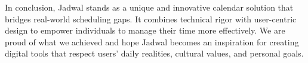 \documentclass[12pt,a4paper,twoside]{report}
\begin{document}
In conclusion, Jadwal stands as a unique and innovative calendar solution that bridges real-world scheduling gaps. It combines technical rigor with user-centric design to empower individuals to manage their time more effectively. We are proud of what we achieved and hope Jadwal becomes an inspiration for creating digital tools that respect users' daily realities, cultural values, and personal goals.





\end{document}
